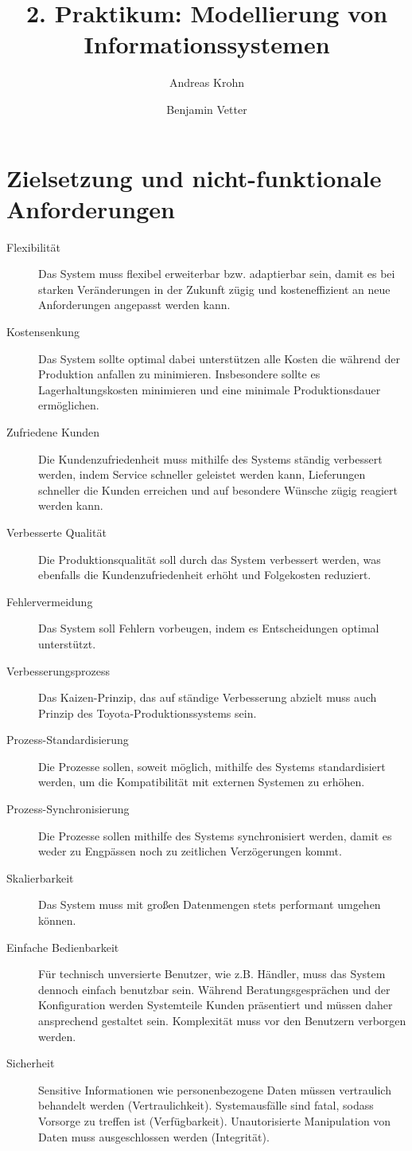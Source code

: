 \documentclass[a4paper,10pt]{article}
\title{2. Praktikum: Modellierung von Informationssystemen}
\author{Andreas Krohn \and Benjamin Vetter}
\begin{document}
\maketitle

\tableofcontents

\section{Zielsetzung und nicht-funktionale Anforderungen}

\begin{description}
  \item[Flexibilität] Das System muss flexibel erweiterbar bzw. adaptierbar sein, damit es bei starken Veränderungen in der Zukunft zügig und kosteneffizient an neue Anforderungen angepasst werden kann.
  \item[Kostensenkung] Das System sollte optimal dabei unterstützen alle Kosten die während der Produktion anfallen zu minimieren.
Insbesondere sollte es Lagerhaltungskosten minimieren und eine minimale Produktionsdauer ermöglichen.
  \item[Zufriedene Kunden] Die Kundenzufriedenheit muss mithilfe des Systems ständig verbessert werden, indem Service schneller geleistet werden kann, Lieferungen schneller die Kunden erreichen und auf besondere Wünsche zügig reagiert werden kann.
  \item[Verbesserte Qualität] Die Produktionsqualität soll durch das System verbessert werden, was ebenfalls die Kundenzufriedenheit erhöht und Folgekosten reduziert.
  \item[Fehlervermeidung] Das System soll Fehlern vorbeugen, indem es Entscheidungen optimal unterstützt.
  \item[Verbesserungsprozess] Das Kaizen-Prinzip, das auf ständige Verbesserung abzielt muss auch Prinzip des Toyota-Produktionssystems sein.
  \item[Prozess-Standardisierung] Die Prozesse sollen, soweit möglich, mithilfe des Systems standardisiert werden, um die Kompatibilität mit externen Systemen zu erhöhen.
  \item[Prozess-Synchronisierung] Die Prozesse sollen mithilfe des Systems synchronisiert werden, damit es weder zu Engpässen noch zu zeitlichen Verzögerungen kommt.
  \item[Skalierbarkeit] Das System muss mit großen Datenmengen stets performant umgehen können.
  \item[Einfache Bedienbarkeit] Für technisch unversierte Benutzer, wie z.B. Händler, muss das System dennoch einfach benutzbar sein. 
Während Beratungsgesprächen und der Konfiguration werden Systemteile Kunden präsentiert und müssen daher ansprechend gestaltet sein.
Komplexität muss vor den Benutzern verborgen werden.
  \item[Sicherheit] Sensitive Informationen wie personenbezogene Daten müssen vertraulich behandelt werden (Vertraulichkeit). 
Systemausfälle sind fatal, sodass Vorsorge zu treffen ist (Verfügbarkeit). 
Unautorisierte Manipulation von Daten muss ausgeschlossen werden (Integrität).
\end{description}
\end{document}
